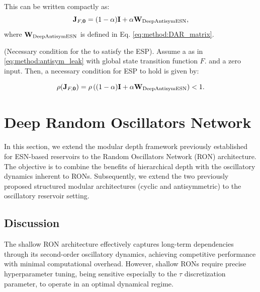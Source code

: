 This can be written compactly as:
\begin{equation}
    \mathbf{J}_{F,\mathbf{0}} = (1-\alpha)\mathbf
{I} + \alpha \mathbf{W}_{\text{DeepAntisymESN}},
\end{equation}
where $\mathbf{W}_{\text{DeepAntisymESN}}$ is defined in Eq. \ref{eq:method:DAR_matrix}.

\begin{theorem}
\label{thm:nec_esp_DAR}
(Necessary condition for the \DAR\@ to satisfy the ESP). 
Assume a \DAR as in \ref{eq:method:antisym_leak} with global state transition function $F$.
and a zero input. Then, a necessary condition for ESP to hold is given by:
\end{theorem} 
\begin{equation}
    \rho(\mathbf{J}_{F,\mathbf{0}}) = \rho\left( (1-\alpha)\mathbf{I} + \alpha \mathbf{W}_{\text{DeepAntisymESN}} \right) < 1.
    \label{eq:method:nec_cond_DAR}
\end{equation}

\section{Deep Random Oscillators Network}
\label{sec:method:dron}
In this section, we extend the modular depth framework previously established for ESN-based reservoirs to the Random Oscillators Network (RON) architecture.
The objective is to combine the benefits of hierarchical depth with the oscillatory dynamics inherent to RONs.
Subsequently, we extend the two previously proposed structured modular architectures (cyclic and antisymmetric) to the oscillatory reservoir setting.

\subsection{Discussion}
The shallow RON architecture effectively captures long-term dependencies through its second-order oscillatory dynamics, achieving competitive performance with minimal computational overhead.
However, shallow RONs require precise hyperparameter tuning, being sensitive especially to the $\tau$ discretization parameter, to operate in an optimal dynamical regime.

